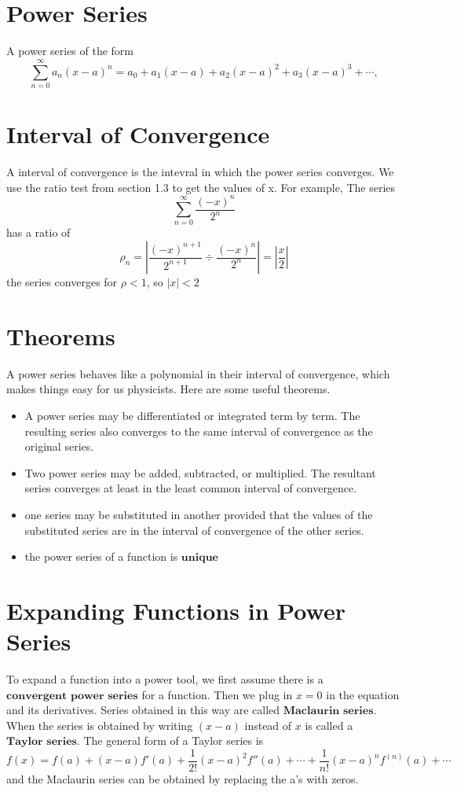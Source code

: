 \documentclass[oneside]{book}
\numberwithin{equation}{chapter} %
\begin{document}
\section{Power Series}
A power series of the form 
$$\sum^\infty_{n=0}a_n(x-a)^n=a_0+a_1(x-a)+a_2(x-a)^2+a_3(x-a)^3+\cdots,$$
\section{Interval of Convergence}
A interval of convergence is the intevral in which the power series converges. We use the ratio test from section 1.3 to get the values of x. For example, 
The series 
$$\sum^\infty_{n=0}\frac{(-x)^n}{2^n}$$
has a ratio of 
$$\rho_n=\left|\frac{(-x)^{n+1}}{2^{n+1}}\div\frac{(-x)^n}{2^n}\right|=\left|\frac x2\right|$$
the series converges for $\rho<1$, so $|x|<2$
\section{Theorems}
A power series behaves like a polynomial in their interval of convergence, which makes things easy for us physicists. Here are some useful theorems. 
\begin{itemize}
	\item A power series may be differentiated or integrated term by term. The resulting series also converges to the same interval of convergence as the original series.
	\item Two power series may be added, subtracted, or multiplied. The resultant series converges at least in the least common interval of convergence.
	\item one series may be substituted in another provided that the values of the substituted series are in the interval of convergence of the other series.
	\item the power series of a function is $\textbf{unique}$
\end{itemize}
\section{Expanding Functions in Power Series}
To expand a function into a power tool, we first assume there is a $\textbf{convergent power series}$ for a function. Then we plug in $x=0$ in the equation and its derivatives. Series obtained in this way are called $\textbf{Maclaurin series}$. When the series is obtained by writing $(x-a)$ instead of $x$ is called a $\textbf{Taylor series}$. The general form of a Taylor series is 
\begin{equation}
	f(x)=f(a)+(x-a)f'(a)+\frac 1{2!}(x-a)^2f''(a)+\cdots+\frac 1{n!}(x-a)^nf^{(n)}(a)+\cdots
\end{equation}
and the Maclaurin series can be obtained by replacing the a's with zeros.
\end{document}
